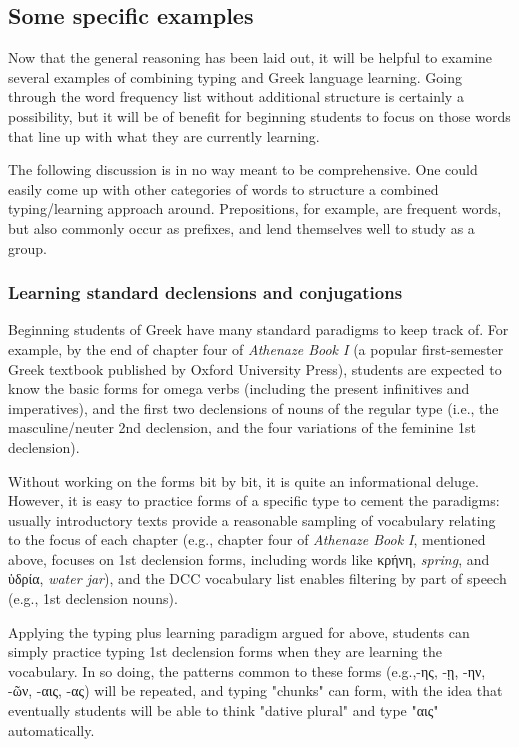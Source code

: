 \documentclass[11pt]{article}
\begin{document}
\subsection{Some specific examples}
\label{sec:orgd23cb5e}

Now that the general reasoning has been laid out, it will be helpful to examine several examples of combining typing and Greek language learning. Going through the word frequency list without additional structure is certainly a possibility, but it will be of benefit for beginning students to focus on those words that line up with what they are currently learning. 

The following discussion is in no way meant to be comprehensive. One could easily come up with other categories of words to structure a combined typing/learning approach around. Prepositions, for example, are frequent words, but also commonly occur as prefixes, and lend themselves well to study as a group.

\subsubsection{Learning standard declensions and conjugations}
\label{sec:orga158b24}

Beginning students of Greek have many standard paradigms to keep track of. For example, by the end of chapter four of \emph{Athenaze Book I} (a popular first-semester Greek textbook published by Oxford University Press), students are expected to know the basic forms for omega verbs (including the present infinitives and imperatives), and the first two declensions of nouns of the regular type (i.e., the masculine/neuter 2nd declension, and the four variations of the feminine 1st declension).

Without working on the forms bit by bit, it is quite an informational deluge. However, it is easy to practice forms of a specific type to cement the paradigms: usually introductory texts provide a reasonable sampling of vocabulary relating to the focus of each chapter (e.g., chapter four of \emph{Athenaze Book I}, mentioned above, focuses on 1st declension forms, including words like κρήνη, \emph{spring}, and ὑδρία, \emph{water jar}), and the DCC vocabulary list enables filtering by part of speech (e.g., 1st declension nouns).

Applying the typing plus learning paradigm argued for above, students can simply practice typing 1st declension forms when they are learning the vocabulary. In so doing, the patterns common to these forms (e.g.,-ης, -ῃ, -ην, -ῶν, -αις, -ας) will be repeated, and typing "chunks" can form, with the idea that eventually students will be able to think "dative plural" and type "αις" automatically.
\end{document}
